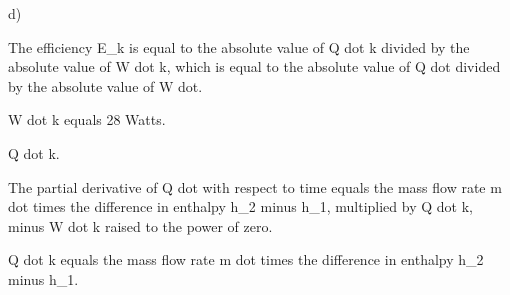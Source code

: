 d)

The efficiency E_k is equal to the absolute value of Q dot k divided by the absolute value of W dot k, which is equal to the absolute value of Q dot divided by the absolute value of W dot.

W dot k equals 28 Watts.

Q dot k.

The partial derivative of Q dot with respect to time equals the mass flow rate m dot times the difference in enthalpy h_2 minus h_1, multiplied by Q dot k, minus W dot k raised to the power of zero.

Q dot k equals the mass flow rate m dot times the difference in enthalpy h_2 minus h_1.